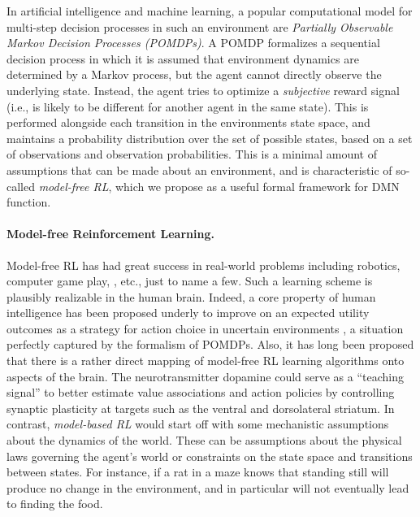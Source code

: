 \documentclass[10pt,letterpaper]{article}
\begin{document}
In artificial intelligence and machine learning, a popular computational model for
multi-step decision processes in such an environment are
\textit{Partially Observable Markov Decision Processes (POMDPs)}\citep{sutton1998reinforcement}.
A POMDP formalizes a sequential decision process in which it is assumed that environment dynamics are determined by a Markov process,
but the agent cannot directly observe the underlying state.
Instead, the agent tries to optimize a \textit{subjective} reward
signal (i.e., is likely to be different for another agent in the same state).
This is performed alongside each transition in the environments state space, and maintains a probability distribution over the set of possible
states, based on a set of observations and observation probabilities. This is a minimal amount of assumptions that can be made about an environment,
and is characteristic of so-called \textit{model-free RL},
which we propose as a useful formal framework for DMN function.
%

\paragraph{Model-free Reinforcement Learning.}
Model-free RL has had great success in real-world problems including robotics\citep{abbeel2004,andrewng}, computer game play, \citep{mnih2015,silver2016mastering},
etc., just to name a few. Such a learning scheme is plausibly realizable in the human brain. Indeed,
a core property of human intelligence has been proposed underly to improve
on an expected utility outcomes as a strategy for action choice in uncertain
environments \citep{gershman2015computational}, a situation perfectly captured by the formalism of POMDPs. Also,
it has long been proposed \citep{dayan2008decision} that there
is a rather direct mapping of model-free RL learning algorithms
onto aspects of the brain.
The neurotransmitter dopamine could serve
as a ``teaching signal'' to better estimate value associations
and action policies by controlling
synaptic plasticity at targets such as the ventral and
dorsolateral striatum.
In contrast, \textit{model-based RL} would start off with some mechanistic assumptions about the dynamics of the world.
These can be assumptions about the physical laws governing the agent's world or constraints on the state space and transitions between states.
For instance, if a rat in a maze knows
that standing still will produce no change in the environment, and in particular will not eventually lead to finding the food.
%
\end{document}

